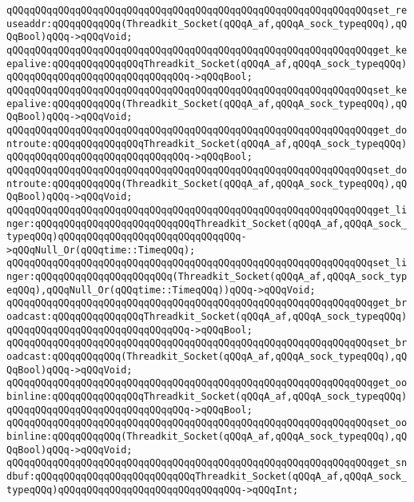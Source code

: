 \verb|qQQqqQQqqQQqqQQqqQQqqQQqqQQqqQQqqQQqqQQqqQQqqQQqqQQqqQQqqQQqqQQqset_reuseaddr:qQQqqQQqqQQq(Threadkit_Socket(qQQqA_af,qQQqA_sock_typeqQQq),qQQqBool)qQQq->qQQqVoid;|\newline
\verb|qQQqqQQqqQQqqQQqqQQqqQQqqQQqqQQqqQQqqQQqqQQqqQQqqQQqqQQqqQQqqQQqget_keepalive:qQQqqQQqqQQqqQQqThreadkit_Socket(qQQqA_af,qQQqA_sock_typeqQQq)qQQqqQQqqQQqqQQqqQQqqQQqqQQqqQQq->qQQqBool;|\newline
\verb|qQQqqQQqqQQqqQQqqQQqqQQqqQQqqQQqqQQqqQQqqQQqqQQqqQQqqQQqqQQqqQQqset_keepalive:qQQqqQQqqQQq(Threadkit_Socket(qQQqA_af,qQQqA_sock_typeqQQq),qQQqBool)qQQq->qQQqVoid;|\newline
\verb|qQQqqQQqqQQqqQQqqQQqqQQqqQQqqQQqqQQqqQQqqQQqqQQqqQQqqQQqqQQqqQQqget_dontroute:qQQqqQQqqQQqqQQqThreadkit_Socket(qQQqA_af,qQQqA_sock_typeqQQq)qQQqqQQqqQQqqQQqqQQqqQQqqQQqqQQq->qQQqBool;|\newline
\verb|qQQqqQQqqQQqqQQqqQQqqQQqqQQqqQQqqQQqqQQqqQQqqQQqqQQqqQQqqQQqqQQqset_dontroute:qQQqqQQqqQQq(Threadkit_Socket(qQQqA_af,qQQqA_sock_typeqQQq),qQQqBool)qQQq->qQQqVoid;|\newline
\verb|qQQqqQQqqQQqqQQqqQQqqQQqqQQqqQQqqQQqqQQqqQQqqQQqqQQqqQQqqQQqqQQqget_linger:qQQqqQQqqQQqqQQqqQQqqQQqqQQqThreadkit_Socket(qQQqA_af,qQQqA_sock_typeqQQq)qQQqqQQqqQQqqQQqqQQqqQQqqQQqqQQq->qQQqNull_Or(qQQqtime::TimeqQQq);|\newline
\verb|qQQqqQQqqQQqqQQqqQQqqQQqqQQqqQQqqQQqqQQqqQQqqQQqqQQqqQQqqQQqqQQqset_linger:qQQqqQQqqQQqqQQqqQQqqQQq(Threadkit_Socket(qQQqA_af,qQQqA_sock_typeqQQq),qQQqNull_Or(qQQqtime::TimeqQQq))qQQq->qQQqVoid;|\newline
\verb|qQQqqQQqqQQqqQQqqQQqqQQqqQQqqQQqqQQqqQQqqQQqqQQqqQQqqQQqqQQqqQQqget_broadcast:qQQqqQQqqQQqqQQqThreadkit_Socket(qQQqA_af,qQQqA_sock_typeqQQq)qQQqqQQqqQQqqQQqqQQqqQQqqQQqqQQq->qQQqBool;|\newline
\verb|qQQqqQQqqQQqqQQqqQQqqQQqqQQqqQQqqQQqqQQqqQQqqQQqqQQqqQQqqQQqqQQqset_broadcast:qQQqqQQqqQQq(Threadkit_Socket(qQQqA_af,qQQqA_sock_typeqQQq),qQQqBool)qQQq->qQQqVoid;|\newline
\verb|qQQqqQQqqQQqqQQqqQQqqQQqqQQqqQQqqQQqqQQqqQQqqQQqqQQqqQQqqQQqqQQqget_oobinline:qQQqqQQqqQQqqQQqThreadkit_Socket(qQQqA_af,qQQqA_sock_typeqQQq)qQQqqQQqqQQqqQQqqQQqqQQqqQQqqQQq->qQQqBool;|\newline
\verb|qQQqqQQqqQQqqQQqqQQqqQQqqQQqqQQqqQQqqQQqqQQqqQQqqQQqqQQqqQQqqQQqset_oobinline:qQQqqQQqqQQq(Threadkit_Socket(qQQqA_af,qQQqA_sock_typeqQQq),qQQqBool)qQQq->qQQqVoid;|\newline
\verb|qQQqqQQqqQQqqQQqqQQqqQQqqQQqqQQqqQQqqQQqqQQqqQQqqQQqqQQqqQQqqQQqget_sndbuf:qQQqqQQqqQQqqQQqqQQqqQQqqQQqThreadkit_Socket(qQQqA_af,qQQqA_sock_typeqQQq)qQQqqQQqqQQqqQQqqQQqqQQqqQQqqQQq->qQQqInt;|\newline
